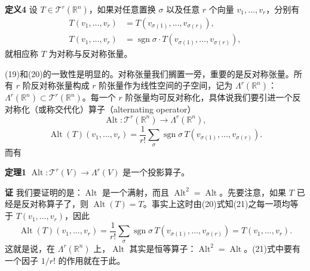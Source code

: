 \noindent\textbf{定义4}
设 $T\in\mathcal T^r(\mathbb R^n)$，如果对任意置换 $\sigma$ 以及任意 $r$ 个向量 $v_1,\ldots,v_r$，分别有
\begin{align}
 T(v_1,\ldots,v_r)&=T(v_{\sigma(1)},\ldots,v_{\sigma(r)}),\tag{20a}\\
 T(v_1,\ldots,v_r)&=\operatorname{sgn}\sigma\cdot T(v_{\sigma(1)},\ldots,v_{\sigma(r)}),\tag{20b}
\end{align}
就相应称 $T$ 为对称与反对称张量。

(19)和(20)的一致性是明显的。对称张量我们搁置一旁，重要的是反对称张量。所有 $r$ 阶反对称张量构成 $r$ 阶张量作为线性空间的子空间，记为 $\Lambda^r(\mathbb R^n)$：$\Lambda^r(\mathbb R^n)\subset\mathcal T^r(\mathbb R^n)$。每一个 $r$ 阶张量均可反对称化，具体说我们要引进一个反对称化（或称交代化）算子（alternating operator）
\[
 \operatorname{Alt}:\mathcal T^r(\mathbb R^n)\longrightarrow\Lambda^r(\mathbb R^n),
\]
\begin{equation}
 \operatorname{Alt}(T)(v_1,\ldots,v_r)
 =\frac1{r!}\sum_\sigma\operatorname{sgn}\sigma\,
 T(v_{\sigma(1)},\ldots,v_{\sigma(r)}).
 \tag{21}
\end{equation}
而有

\noindent\textbf{定理1}
$\operatorname{Alt}:\mathcal T^r(V)\to\Lambda^r(V)$ 是一个投影算子。

\noindent\textbf{证}
我们要证明的是：$\operatorname{Alt}$ 是一个满射，而且 $\operatorname{Alt}^2=\operatorname{Alt}$。先要注意，如果 $T$ 已经是反对称算子了，则 $\operatorname{Alt}(T)=T$。事实上这时由(20)式知(21)之每一项均等于 $T(v_1,\ldots,v_r)$，因此
\begin{equation}
 \operatorname{Alt}(T)(v_1,\ldots,v_r)
 =\frac1{r!}\sum_\sigma\operatorname{sgn}\sigma\,
 T(v_{\sigma(1)},\ldots,v_{\sigma(r)})
 =T(v_1,\ldots,v_r).
 \tag{22}
\end{equation}
这就是说，在 $\Lambda^r(\mathbb R^n)$ 上，$\operatorname{Alt}$ 其实是恒等算子：$\operatorname{Alt}^2=\operatorname{Alt}$。(21)式中要有一个因子 $1/r!$ 的作用就在于此。

